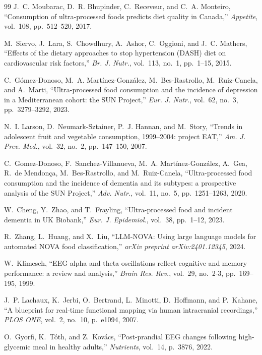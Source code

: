 \documentclass[journal]{IEEEtran}
\begin{document}
\begin{thebibliography}{99}
J.~C. Moubarac, D.~R. Bhupinder, C.~Receveur, and C.~A. Monteiro,
``Consumption of ultra-processed foods predicts diet quality in Canada,''
\textit{Appetite}, vol.~108, pp.~512--520, 2017.

M.~Siervo, J.~Lara, S.~Chowdhury, A.~Ashor, C.~Oggioni, and J.~C. Mathers,
``Effects of the dietary approaches to stop hypertension (DASH) diet on
cardiovascular risk factors,'' \textit{Br. J. Nutr.}, vol.~113, no.~1, pp.~1--15, 2015.

C.~Gómez-Donoso, M.~A. Martínez-González, M.~Bes-Rastrollo, M.~Ruiz-Canela,
and A.~Marti, ``Ultra-processed food consumption and the incidence of depression
in a Mediterranean cohort: the SUN Project,'' \textit{Eur. J. Nutr.},
vol.~62, no.~3, pp.~3279--3292, 2023.

N.~I. Larson, D.~Neumark-Sztainer, P.~J. Hannan, and M.~Story,
``Trends in adolescent fruit and vegetable consumption, 1999--2004: project EAT,''
\textit{Am. J. Prev. Med.}, vol.~32, no.~2, pp.~147--150, 2007.

C.~Gomez-Donoso, F.~Sanchez-Villanueva, M.~A. Martínez-González,
A.~Gea, R.~de Mendonça, M.~Bes-Rastrollo, and M.~Ruiz-Canela,
``Ultra-processed food consumption and the incidence of dementia and its subtypes:
a prospective analysis of the SUN Project,'' \textit{Adv. Nutr.},
vol.~11, no.~5, pp.~1251--1263, 2020.

W.~Cheng, Y.~Zhao, and T.~Frayling, ``Ultra-processed food and incident dementia
in UK Biobank,'' \textit{Eur. J. Epidemiol.}, vol.~38, pp.~1--12, 2023.

R.~Zhang, L.~Huang, and X.~Liu, ``LLM-NOVA: Using large language models for
automated NOVA food classification,'' \textit{arXiv preprint arXiv:2401.12345}, 2024.

W.~Klimesch, ``EEG alpha and theta oscillations reflect cognitive and memory
performance: a review and analysis,'' \textit{Brain Res. Rev.},
vol.~29, no.~2-3, pp.~169--195, 1999.

J.~P. Lachaux, K.~Jerbi, O.~Bertrand, L.~Minotti, D.~Hoffmann, and P.~Kahane,
``A blueprint for real-time functional mapping via human intracranial recordings,''
\textit{PLOS ONE}, vol.~2, no.~10, p.~e1094, 2007.

O.~Gyorfi, K.~Tóth, and Z.~Kovács, ``Post-prandial EEG changes following
high-glycemic meal in healthy adults,'' \textit{Nutrients}, vol.~14, p.~3876, 2022.


\end{thebibliography}
\end{document}

